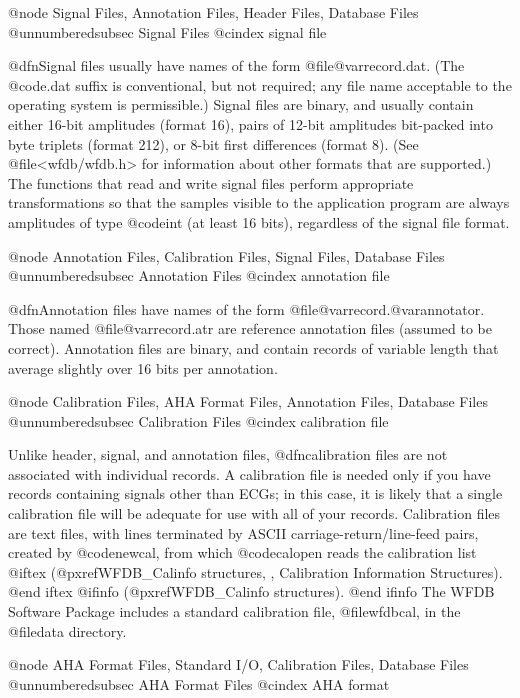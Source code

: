 {{{{{{{{{{@node     Signal Files, Annotation Files, Header Files, Database Files
@unnumberedsubsec Signal Files
@cindex signal file

@dfn{Signal files} usually have names of the form
@file{@var{record}.dat}.  (The @code{.dat} suffix is conventional, but
not required; any file name acceptable to the operating system is
permissible.)  Signal files are binary, and usually contain either
16-bit amplitudes (format 16), pairs of 12-bit amplitudes bit-packed
into byte triplets (format 212), or 8-bit first differences (format 8).
(See @file{<wfdb/wfdb.h>} for information about other formats that are
supported.)  The functions that read and write signal files perform
appropriate transformations so that the samples visible to the
application program are always amplitudes of type @code{int} (at least
16 bits), regardless of the signal file format.

@node     Annotation Files, Calibration Files, Signal Files, Database Files
@unnumberedsubsec Annotation Files
@cindex annotation file

@dfn{Annotation files} have names of the form
@file{@var{record}.@var{annotator}}.  Those named
@file{@var{record}.atr} are reference annotation files (assumed to be
correct).  Annotation files are binary, and contain records of variable
length that average slightly over 16 bits per annotation.

@node     Calibration Files, AHA Format Files, Annotation Files, Database Files
@unnumberedsubsec Calibration Files
@cindex calibration file

Unlike header, signal, and annotation files, @dfn{calibration files} are
not associated with individual records.  A calibration file is needed
only if you have records containing signals other than ECGs;  in this
case, it is likely that a single calibration file will be adequate for use
with all of your records.  Calibration files are text files, with lines
terminated by ASCII carriage-return/line-feed pairs, created by
@code{newcal}, from which @code{calopen} reads the calibration list
@iftex
(@pxref{WFDB_Calinfo structures, , Calibration Information Structures}).
@end iftex
@ifinfo
(@pxref{WFDB_Calinfo structures}).
@end ifinfo
The WFDB Software Package includes a standard calibration file,
@file{wfdbcal}, in the @file{data} directory.

@node     AHA Format Files, Standard I/O, Calibration Files, Database Files
@unnumberedsubsec AHA Format Files
@cindex AHA format

}}}}}}}}}}
